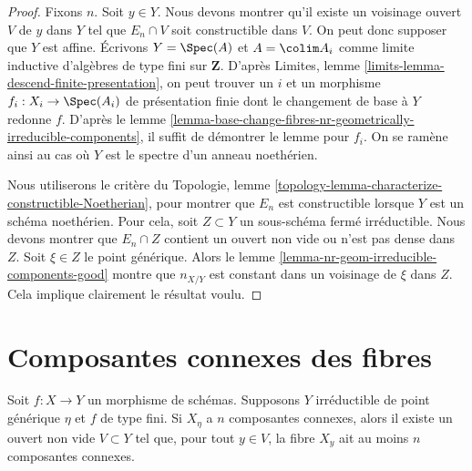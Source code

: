 \begin{proof}
Fixons $n$. Soit $y \in Y$. Nous devons montrer qu'il existe un voisinage ouvert
$V$ de $y$ dans $Y$ tel que $E_n \cap V$ soit constructible dans $V$. On peut donc
supposer que $Y$ est affine. Écrivons $Y = \Spec(A)$ et
$A = \colim A_i$ comme limite inductive d'algèbres
de type fini sur $\mathbf{Z}$. D'après
Limites, lemme \ref{limits-lemma-descend-finite-presentation},
on peut trouver un $i$ et un morphisme $f_i : X_i \to \Spec(A_i)$ de
présentation finie dont le changement de base à $Y$ redonne $f$. D'après le
lemme \ref{lemma-base-change-fibres-nr-geometrically-irreducible-components},
il suffit de démontrer le lemme pour $f_i$. On se ramène ainsi au
cas où $Y$ est le spectre d'un anneau noethérien.

\medskip\noindent
Nous utiliserons le critère du
Topologie, lemme \ref{topology-lemma-characterize-constructible-Noetherian},
pour montrer que $E_n$ est constructible lorsque $Y$ est un schéma noethérien.
Pour cela, soit $Z \subset Y$ un sous-schéma fermé irréductible.
Nous devons montrer que $E_n \cap Z$ contient un ouvert non vide
ou n'est pas dense dans $Z$. Soit $\xi \in Z$ le point générique. Alors le
lemme \ref{lemma-nr-geom-irreducible-components-good}
montre que $n_{X/Y}$ est constant dans un voisinage de $\xi$ dans $Z$.
Cela implique clairement le résultat voulu.
\end{proof}

\section{Composantes connexes des fibres}
\label{section-connected}

\begin{lemma}
\label{lemma-connected-components-in-neighbourhood}
Soit $f : X \to Y$ un morphisme de schémas. Supposons $Y$ irréductible de
point générique $\eta$ et $f$ de type fini. Si $X_\eta$ a $n$
composantes connexes, alors il existe un ouvert non vide $V \subset Y$
tel que, pour tout $y \in V$, la fibre $X_y$ ait au moins $n$
composantes connexes.
\end{lemma}

